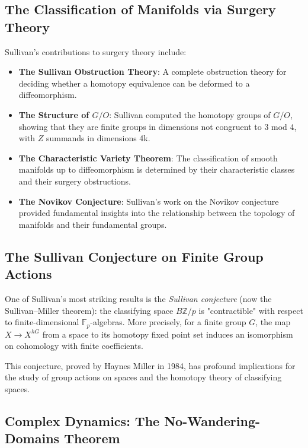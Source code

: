 \subsection{The Classification of Manifolds via Surgery Theory}

Sullivan's contributions to surgery theory include:

\begin{itemize}
\item \textbf{The Sullivan Obstruction Theory}: A complete obstruction theory for deciding whether a homotopy equivalence can be deformed to a diffeomorphism.

\item \textbf{The Structure of $G/O$}: Sullivan computed the homotopy groups of $G/O$, showing that they are finite groups in dimensions not congruent to 3 mod 4, with $Z$ summands in dimensions 4k.

\item \textbf{The Characteristic Variety Theorem}: The classification of smooth manifolds up to diffeomorphism is determined by their characteristic classes and their surgery obstructions.

\item \textbf{The Novikov Conjecture}: Sullivan's work on the Novikov conjecture provided fundamental insights into the relationship between the topology of manifolds and their fundamental groups.
\end{itemize}

\subsection{The Sullivan Conjecture on Finite Group Actions}

One of Sullivan's most striking results is the \emph{Sullivan conjecture} (now the Sullivan--Miller theorem): the classifying space $B\mathbb{Z}/p$ is "contractible" with respect to finite-dimensional $\mathbb{F}_p$-algebras. More precisely, for a finite group $G$, the map $X \to X^{hG}$ from a space to its homotopy fixed point set induces an isomorphism on cohomology with finite coefficients.

This conjecture, proved by Haynes Miller in 1984, has profound implications for the study of group actions on spaces and the homotopy theory of classifying spaces.

\subsection{Complex Dynamics: The No-Wandering-Domains Theorem}

